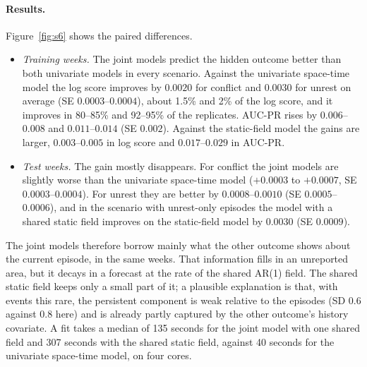 \paragraph{Results.} Figure~\ref{fig:s6} shows the paired differences.
\begin{itemize}
\item \emph{Training weeks.} The joint models predict the hidden outcome better than
both univariate models in every scenario. Against the univariate space-time model the
log score improves by $0.0020$ for conflict and $0.0030$ for unrest on average (SE
$0.0003$--$0.0004$), about 1.5\% and 2\% of the log score, and it improves in 80--85\%
and 92--95\% of the replicates. AUC-PR rises by $0.006$--$0.008$ and $0.011$--$0.014$
(SE $0.002$). Against the static-field model the gains are larger, $0.003$--$0.005$ in log
score and $0.017$--$0.029$ in AUC-PR.
\item \emph{Test weeks.} The gain mostly disappears. For conflict the joint models are
slightly worse than the univariate space-time model ($+0.0003$ to $+0.0007$, SE
$0.0003$--$0.0004$). For unrest they are better by $0.0008$--$0.0010$ (SE $0.0005$--$0.0006$),
and in the scenario with unrest-only episodes the model with a shared static field
improves on the static-field model by $0.0030$ (SE $0.0009$).
\end{itemize}
The joint models therefore borrow mainly what the other outcome shows about the
current episode, in the same weeks. That information fills in an unreported area,
but it decays in a forecast at the rate of the shared AR(1) field. The shared static
field keeps only a small part of it; a plausible explanation is that, with events
this rare, the persistent component is weak relative to the episodes (SD 0.6 against
0.8 here) and is already partly captured by the other outcome's history covariate. A fit takes a
median of 135 seconds for the joint model with one shared field and 307 seconds with
the shared static field, against 40 seconds for the univariate space-time model, on
four cores.

